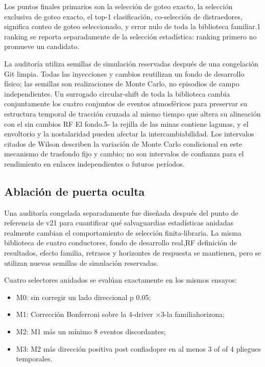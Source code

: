 \documentclass{ieeeaccess}
\providecommand{\tightlist}{\setlength{\itemsep}{0pt}\setlength{\parskip}{0pt}}
\begin{document}
Los puntos finales primarios son la selección de goteo exacto, la selección exclusiva de goteo exacto, el top-1 clasificación, co-selección de distraedores, significa conteo de goteo seleccionado, y error nulo de toda la biblioteca familiar.1 ranking se reporta separadamente de la selección estadística: ranking primero no promueve un candidato.

La auditoría utiliza semillas de simulación reservadas después de una congelación Git limpia. Todas las inyecciones y cambios reutilizan un fondo de desarrollo físico; las semillas son realizaciones de Monte Carlo, no episodios de campo independientes. Un surrogado circular-shift de toda la biblioteca cambia conjuntamente los cuatro conjuntos de eventos atmosféricos para preservar su estructura temporal de tracción cruzada al mismo tiempo que altera su alineación con el sin cambios RF El fondo.5- la rejilla de las minas contiene lagunas, y el envoltorio y la nostalaridad pueden afectar la intercambiabilidad. Los intervalos citados de Wilson describen la variación de Monte Carlo condicional en este mecanismo de trasfondo fijo y cambio; no son intervalos de confianza para el rendimiento en enlaces independientes o futuros períodos.

\subsection{Ablación de puerta oculta}\label{ablaciuxf3n-de-puerta-oculta}

Una auditoría congelada separadamente fue diseñada después del punto de referencia de v21 para cuantificar qué salvaguardias estadísticas anidadas realmente cambian el comportamiento de selección finita-libraria. La misma biblioteca de cuatro conductores, fondo de desarrollo real,RF definición de resultados, efecto familia, retrasos y horizontes de respuesta se mantienen, pero se utilizan nuevas semillas de simulación reservadas.

Cuatro selectores anidados se evalúan exactamente en los mismos ensayos:

\begin{itemize}
\tightlist
\item
  M0: sin corregir un lado direccional p 0.05;
\item
  M1: Corrección Bonferroni sobre la 4-driver ×3-la familiahorizona;
\item
  M2: M1 más un mínimo 8 eventos discordantes;
\item
  M3: M2 más dirección positiva post confiadopre en al menos 3 of of 4 pliegues temporales.
\end{itemize}
\end{document}
